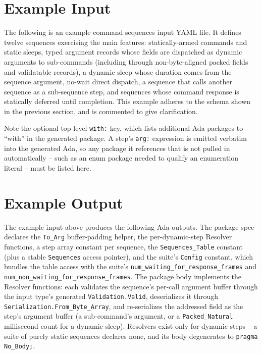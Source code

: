 
\section{Example Input}

The following is an example command sequences input YAML file. It defines twelve sequences exercising the main features: statically-armed commands and static sleeps, typed argument records whose fields are dispatched as dynamic arguments to sub-commands (including through non-byte-aligned packed fields and validatable records), a dynamic sleep whose duration comes from the sequence argument, no-wait direct dispatch, a sequence that calls another sequence as a sub-sequence step, and sequences whose command response is statically deferred until completion. This example adheres to the schema shown in the previous section, and is commented to give clarification.

Note the optional top-level \texttt{with:} key, which lists additional Ada packages to ``with'' in the generated package. A step's \texttt{arg:} expression is emitted verbatim into the generated Ada, so any package it references that is not pulled in automatically -- such as an enum package needed to qualify an enumeration literal -- must be listed here.


\section{Example Output}

The example input above produces the following Ada outputs. The package spec declares the \texttt{To\_Arg} buffer-padding helper, the per-dynamic-step Resolver functions, a step array constant per sequence, the \texttt{Sequences\_Table} constant (plus a stable \texttt{Sequences} access pointer), and the suite's \texttt{Config} constant, which bundles the table access with the suite's \texttt{num\_waiting\_for\_response\_frames} and \texttt{num\_non\_waiting\_for\_response\_frames}. The package body implements the Resolver functions: each validates the sequence's per-call argument buffer through the input type's generated \texttt{Validation.Valid}, deserializes it through \texttt{Serialization.From\_Byte\_Array}, and re-serializes the addressed field as the step's argument buffer (a sub-command's argument, or a \texttt{Packed\_Natural} millisecond count for a dynamic sleep). Resolvers exist only for dynamic steps -- a suite of purely static sequences declares none, and its body degenerates to \texttt{pragma No\_Body;}.

